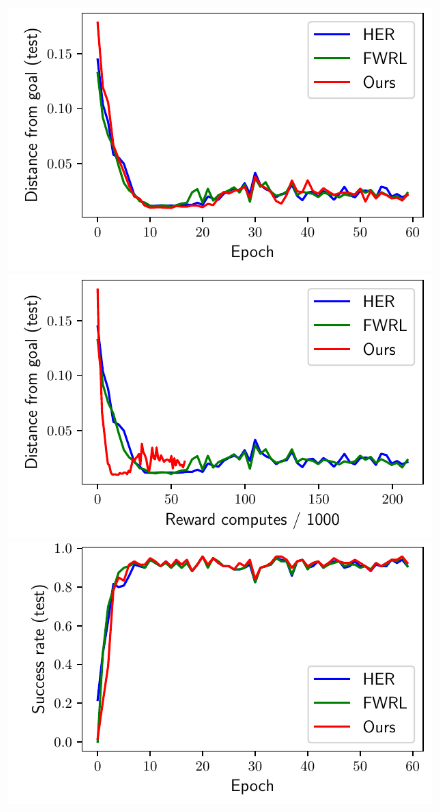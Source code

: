 \begin{figure}%
  \def\frac{0.24}
  \includegraphics[width=\frac\columnwidth]{media/res/6efc1de-path_reward_low_thresh_chosen-FetchReachPR-v1-dqst/epoch-test/ag_g_dist.pdf}%
  \includegraphics[width=\frac\columnwidth]{media/res/6efc1de-path_reward_low_thresh_chosen-FetchReachPR-v1-dqst/reward_computes-test/ag_g_dist.pdf}%
  \includegraphics[width=\frac\columnwidth]{media/res/6efc1de-path_reward_low_thresh_chosen-FetchReachPR-v1-dqst/epoch-test/success_rate.pdf}%

\end{figure}
